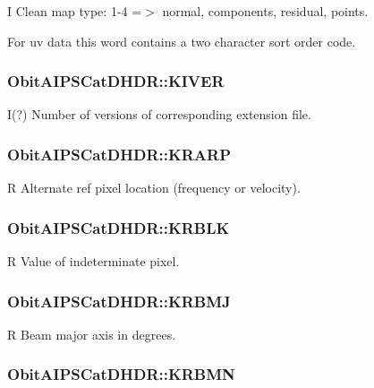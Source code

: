 I Clean map type: 1-4 =$>$ normal, components, residual, points. 

For uv data this word contains a two character sort order code. 
\subsubsection{ {\bf Obit\-AIPSCat\-DHDR::KIVER}}\label{structObitAIPSCatDHDR_o46}


I(?) Number of versions of corresponding extension file. 

\subsubsection{ {\bf Obit\-AIPSCat\-DHDR::KRARP}}\label{structObitAIPSCatDHDR_o22}


R Alternate ref pixel location (frequency or velocity). 

\subsubsection{ {\bf Obit\-AIPSCat\-DHDR::KRBLK}}\label{structObitAIPSCatDHDR_o15}


R Value of indeterminate pixel. 

\subsubsection{ {\bf Obit\-AIPSCat\-DHDR::KRBMJ}}\label{structObitAIPSCatDHDR_o19}


R Beam major axis in degrees. 

\subsubsection{ {\bf Obit\-AIPSCat\-DHDR::KRBMN}}\label{structObitAIPSCatDHDR_o20}


